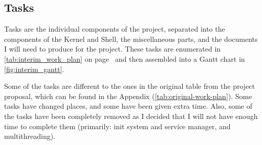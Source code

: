 \documentclass{article}
\begin{document}
\subsection{Tasks}
Tasks are the individual components of the project, separated into the
components of the Kernel and Shell, the miscellaneous parts, and the documents
I will need to produce for the project. These tasks are enumerated in
\autoref{tab:interim_work_plan} on page~\pageref*{tab:work-plan} and then assembled into
a Gantt chart in \autoref{fig:interim_gantt}.

Some of the tasks are different to the ones in the original table from the
project proposal, which can be found in the Appendix
(\autoref{tab:original-work-plan}). Some tasks have changed places, and some
have been given extra time. Also, some of the tasks have been completely
removed as I decided that I will not have enough time to complete them
(primarily: init system and service manager, and multithreading).
\end{document}
